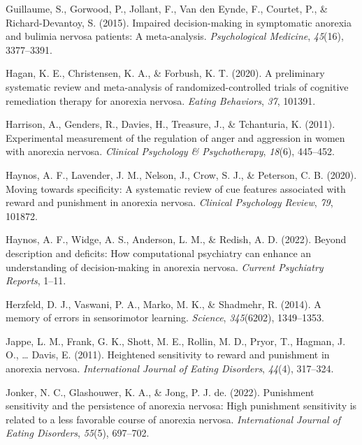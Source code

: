 \documentclass[
  man,floatsintext]{apa6}
\newlength{\cslhangindent}
\newlength{\cslentryspacingunit} %
\newenvironment{CSLReferences}[2] %
 {%
  \setlength{\parindent}{0pt}
  \ifodd #1
  \let\oldpar\par
  \def\par{\hangindent=\cslhangindent\oldpar}
  \fi
  \setlength{\parskip}{#2\cslentryspacingunit}
 }%
 {}
\begin{document}
\begin{CSLReferences}{1}{0}
\leavevmode{}%
Guillaume, S., Gorwood, P., Jollant, F., Van den Eynde, F., Courtet, P., \& Richard-Devantoy, S. (2015). Impaired decision-making in symptomatic anorexia and bulimia nervosa patients: A meta-analysis. \emph{Psychological Medicine}, \emph{45}(16), 3377--3391.

\leavevmode{}%
Hagan, K. E., Christensen, K. A., \& Forbush, K. T. (2020). A preliminary systematic review and meta-analysis of randomized-controlled trials of cognitive remediation therapy for anorexia nervosa. \emph{Eating Behaviors}, \emph{37}, 101391.

\leavevmode{}%
Harrison, A., Genders, R., Davies, H., Treasure, J., \& Tchanturia, K. (2011). Experimental measurement of the regulation of anger and aggression in women with anorexia nervosa. \emph{Clinical Psychology \& Psychotherapy}, \emph{18}(6), 445--452.

\leavevmode{}%
Haynos, A. F., Lavender, J. M., Nelson, J., Crow, S. J., \& Peterson, C. B. (2020). Moving towards specificity: A systematic review of cue features associated with reward and punishment in anorexia nervosa. \emph{Clinical Psychology Review}, \emph{79}, 101872.

\leavevmode{}%
Haynos, A. F., Widge, A. S., Anderson, L. M., \& Redish, A. D. (2022). Beyond description and deficits: How computational psychiatry can enhance an understanding of decision-making in anorexia nervosa. \emph{Current Psychiatry Reports}, 1--11.

\leavevmode{}%
Herzfeld, D. J., Vaswani, P. A., Marko, M. K., \& Shadmehr, R. (2014). A memory of errors in sensorimotor learning. \emph{Science}, \emph{345}(6202), 1349--1353.

\leavevmode{}%
Jappe, L. M., Frank, G. K., Shott, M. E., Rollin, M. D., Pryor, T., Hagman, J. O., \ldots{} Davis, E. (2011). Heightened sensitivity to reward and punishment in anorexia nervosa. \emph{International Journal of Eating Disorders}, \emph{44}(4), 317--324.

\leavevmode{}%
Jonker, N. C., Glashouwer, K. A., \& Jong, P. J. de. (2022). Punishment sensitivity and the persistence of anorexia nervosa: High punishment sensitivity is related to a less favorable course of anorexia nervosa. \emph{International Journal of Eating Disorders}, \emph{55}(5), 697--702.


\end{CSLReferences}
\end{document}
